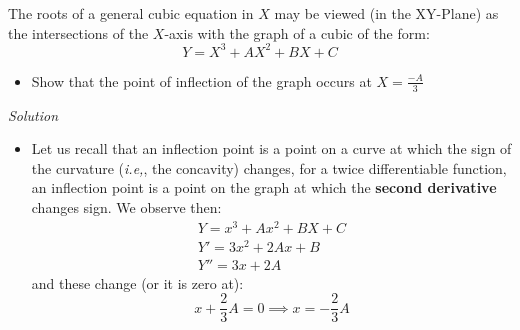 \begin{exc}
	The roots of a general cubic equation in $ X $ may be viewed (in the XY-Plane) as the intersections of the $ X$-axis with the graph of a cubic of the form:
	\[ Y = X^3 + AX^2 + BX + C \]
	\begin{itemize}
		\item Show that the point of inflection of the graph occurs at $ X = \frac{-A}{3} $
	\end{itemize}
\end{exc}

\textit{Solution}
\begin{itemize}
	\item Let us recall that an inflection point is a point on a curve at which the sign of the curvature (\textit{i.e,}, the concavity) changes, for a twice differentiable function, an inflection point is a point on the graph at which the \textbf{second derivative} changes sign. We observe then:
	\begin{align*}
	Y = x^3 + A x ^2 + BX + C \\
	Y' = 3x^2 + 2Ax + B \\
	Y'' = 3x + 2A
	\end{align*}
	and these change (or it is zero at):
	\[ x + \frac{2}{3}A = 0 \implies x = - \frac{2}{3}A  \]
\end{itemize}
